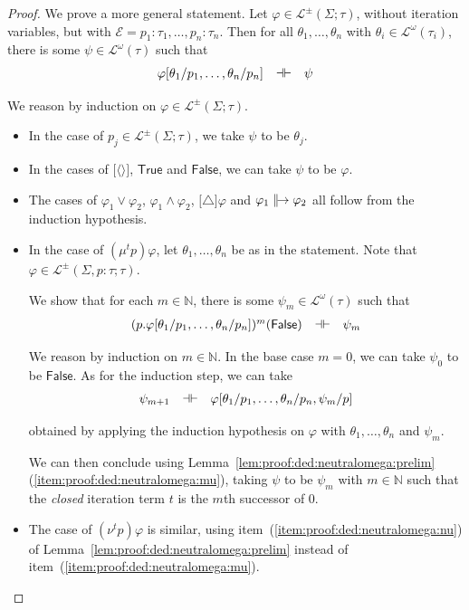 \documentclass[%
  a4paper,
  UKenglish,
  cleveref,
  autoref,
  thm-restate,
  numberwithinsect,
]{lipics-v2021}
\newcommand\defthesisiff{\dashv\vdash}
\newcommand\thesisiff{\mathrel{\defthesisiff}}
\newcommand\pair[1]{{\langle #1\rangle}}
\newcommand\NN{\mathbb{N}}
\newcommand\temp[1]{\mathsf{#1}}
\newcommand\True{\temp{True}}
\newcommand\False{\temp{False}}
\newcommand\Env{\mathcal{E}}    %
\newcommand\defrealto{\mathrel\parallel\joinrel\to}
\newcommand\realto{\mathrel{\defrealto}}
\newcommand\PT{\tau}		%
\newcommand\FP{p}
\newcommand\FPEnv{\Sigma}
\newcommand\finmu{\mu}
\newcommand\finnu{\nu}
\newcommand\Lang{\mathcal{L}}
\newcommand\form[1]{\lbrack #1 \rbrack}
\newcommand\modgen{\mathord{\triangle}}	%
\begin{document}
\begin{proof}
We prove a more general statement.
Let $\varphi \in \Lang^\pm(\FPEnv;\PT)$,
without iteration variables,
but with $\Env = \FP_1\colon\PT_1,\dots,\FP_n\colon\PT_n$.
Then for all $\theta_1,\dots,\theta_n$
with $\theta_i \in \Lang^\omega(\PT_i)$,
there is some $\psi \in \Lang^\omega(\PT)$
such that
\[
\begin{array}{l l l}
  \varphi[\theta_1 / \FP_1, \dots, \theta_n / \FP_n] 
& \thesisiff
& \psi
\end{array}
\]

We reason by induction on $\varphi \in \Lang^\pm(\FPEnv;\PT)$.
\begin{itemize}
\item In the case of $\FP_j \in \Lang^\pm(\FPEnv;\PT)$,
we take $\psi$ to be $\theta_j$.

\item In the cases of $\form{\pair{}}$, $\True$ and $\False$,
we can take $\psi$ to be $\varphi$.

\item
The cases of $\varphi_1 \lor \varphi_2$, $\varphi_1 \land \varphi_2$,
$\form{\modgen}\varphi$ and $\varphi_1 \realto \varphi_2$
all follow from the induction hypothesis.

\item
In the case of $(\finmu^t \FP)\varphi$,
let $\theta_1,\dots,\theta_n$ be as in the statement.
Note that $\varphi \in \Lang^{\pm}(\FPEnv, \FP\colon\PT; \PT)$.

We show that for each $m \in \NN$,
there is some $\psi_m \in \Lang^\omega(\PT)$ such that
\[
\begin{array}{l l l}
  (\FP.\varphi[\theta_1 / \FP_1, \dots, \theta_n / \FP_n])^m(\False)
& \thesisiff
& \psi_m
\end{array}
\]

We reason by induction on $m \in \NN$.
In the base case $m = 0$, we can take $\psi_0$ to be $\False$.
As for the induction step, we can take
\[
\begin{array}{l l l}
  \psi_{m+1}
& \thesisiff
& \varphi[\theta_1 / \FP_1, \dots, \theta_n / \FP_n, \psi_m / \FP]
\end{array}
\]

\noindent
obtained by applying the induction hypothesis on $\varphi$
with $\theta_1,\dots,\theta_n$ and $\psi_m$.

We can then conclude using
Lemma~\ref{lem:proof:ded:neutralomega:prelim}(\ref{item:proof:ded:neutralomega:mu}),
taking $\psi$ to be $\psi_m$ with
$m \in \NN$ such that the \emph{closed} iteration term $t$
is the $m$th successor of $0$.

\item
The case of $(\finnu^t \FP)\varphi$
is similar, using item~(\ref{item:proof:ded:neutralomega:nu})
of Lemma~\ref{lem:proof:ded:neutralomega:prelim}
instead of item~(\ref{item:proof:ded:neutralomega:mu}).
\qedhere
\end{itemize}
\end{proof}
\end{document}

